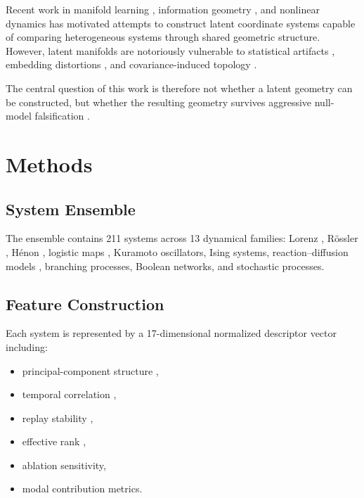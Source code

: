 \documentclass[
reprint,
superscriptaddress,
amsmath,
amssymb,
aps,
chaos
]{revtex4-2}
\begin{document}
Recent work in manifold learning \cite{tenenbaum2000global, roweis2000nonlinear, belkin2003laplacian, mcinnes2018umap}, information geometry \cite{amari2016information, amari1982differential}, and nonlinear dynamics \cite{strogatz2015nonlinear, guckenheimer1983nonlinear} has motivated attempts to construct latent coordinate systems capable of comparing heterogeneous systems through shared geometric structure. However, latent manifolds are notoriously vulnerable to statistical artifacts \cite{theiler1990estimating}, embedding distortions \cite{donoho2000intrinsic}, and covariance-induced topology \cite{costa2007intrinsic}.

The central question of this work is therefore not whether a latent geometry can be constructed, but whether the resulting geometry survives aggressive null-model falsification \cite{cover1991elements, villani2009optimal}.

\section{Methods}

\subsection{System Ensemble}

The ensemble contains 211 systems across 13 dynamical families:
Lorenz \cite{lorenz1963deterministic}, R\"ossler \cite{rossler1976equation}, H\'enon \cite{henon1976two-dimensional}, logistic maps \cite{feigenbaum1978quantitative}, Kuramoto oscillators, Ising systems, reaction--diffusion models \cite{prigogine1968dissipative}, branching processes, Boolean networks, and stochastic processes.

\subsection{Feature Construction}

Each system is represented by a 17-dimensional normalized descriptor vector including:
\begin{itemize}
\item principal-component structure \cite{broomhead1986extracting},
\item temporal correlation \cite{kantz1997nonlinear},
\item replay stability \cite{fraser1986independent},
\item effective rank \cite{roy1989effective, yang2018effective},
\item ablation sensitivity,
\item modal contribution metrics.
\end{itemize}
\end{document}
